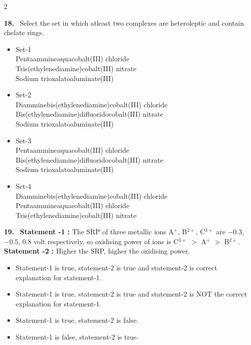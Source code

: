 \documentclass[10pt]{extarticle}
\newcommand{\qn}[1]{\par\smallskip\noindent\textbf{#1.}~}
\newenvironment{qoptions}{\begin{itemize}[leftmargin=1.8em,itemsep=1pt,topsep=2pt,label={}]}{\end{itemize}}
\newcommand{\opt}[2]{\item[(#1)] #2}
\begin{document}
\begin{multicols}{2}
\qn{18} Select the set in which atleast two complexes are heteroleptic and contain chelate rings.
\begin{qoptions}
\opt{A}{Set-1\\ Pentaammineaquacobalt(III) chloride\\ Tris(ethylenediamine)cobalt(III) nitrate\\ Sodium trioxalatoaluminate(III)}
\opt{B}{Set-2\\ Diamminebis(ethylenediamine)cobalt(III) chloride\\ Bis(ethylenediamine)difluoridocobalt(III) nitrate\\ Sodium trioxalatoaluminate(III)}
\opt{C}{Set-3\\ Pentaammineaquacobalt(III) chloride\\ Bis(ethylenediamine)difluoridocobalt(III) nitrate\\ Sodium trioxalatoaluminate(III)}
\opt{D}{Set-4\\ Diamminebis(ethylenediamine)cobalt(III) chloride\\ Pentaammineaquacobalt(III) chloride\\ Tris(ethylenediamine)cobalt(III) nitrate}
\end{qoptions}

\qn{19} \textbf{Statement -1 :} The SRP of three metallic ions A$^{+}$, B$^{2+}$, C$^{3+}$ are $-0.3$, $-0.5$, 0.8 volt respectively, so oxidising power of ions is C$^{3+}$ $>$ A$^{+}$ $>$ B$^{2+}$.\\
\textbf{Statement -2 :} Higher the SRP, higher the oxidising power.
\begin{qoptions}
\opt{A}{Statement-1 is true, statement-2 is true and statement-2 is correct explanation for statement-1.}
\opt{B}{Statement-1 is true, statement-2 is true and statement-2 is NOT the correct explanation for statement-1.}
\opt{C}{Statement-1 is true, statement-2 is false.}
\opt{D}{Statement-1 is false, statement-2 is true.}
\end{qoptions}


\end{multicols}
\end{document}
